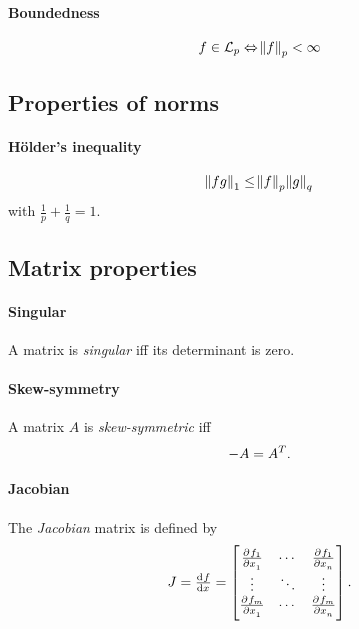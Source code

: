 \paragraph{Boundedness}
\begin{equation}
	f \in \mathcal{L}_p \Leftrightarrow \norm{f}_p < \infty
\end{equation}

\subsection{Properties of norms}
\paragraph{Hölder's inequality}
\begin{equation}
	\norm{fg}_1 \leq \norm{f}_p \norm{g}_q
\end{equation}
with $\frac{1}{p} + \frac{1}{q} = 1$.

\subsection{Matrix properties}
\paragraph{Singular} A matrix is \emph{singular} iff its determinant is zero.

\paragraph{Skew-symmetry} A matrix $A$ is \emph{skew-symmetric} iff
\begin{equation}
	-A = A^T
	.
\end{equation}

\paragraph{Jacobian} The \emph{Jacobian} matrix is defined by
\begin{equation}
	J
	=
	\od{f}{x}
	=
	\begin{bmatrix}
		\pd{f_1}{x_1} & \cdots & \pd{f_1}{x_n} \\
		\vdots        & \ddots & \vdots        \\
		\pd{f_m}{x_1} & \cdots & \pd{f_m}{x_n}
	\end{bmatrix}
	.
\end{equation}

